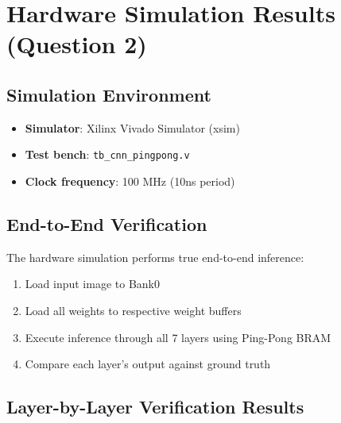 \documentclass[11pt,a4paper]{article}
\begin{document}
\section{Hardware Simulation Results (Question 2)}

\subsection{Simulation Environment}
\begin{itemize}
    \item \textbf{Simulator}: Xilinx Vivado Simulator (xsim)
    \item \textbf{Test bench}: \texttt{tb\_cnn\_pingpong.v}
    \item \textbf{Clock frequency}: 100 MHz (10ns period)
\end{itemize}

\subsection{End-to-End Verification}
The hardware simulation performs true end-to-end inference:
\begin{enumerate}
    \item Load input image to Bank0
    \item Load all weights to respective weight buffers
    \item Execute inference through all 7 layers using Ping-Pong BRAM
    \item Compare each layer's output against ground truth
\end{enumerate}

\subsection{Layer-by-Layer Verification Results}
\end{document}
